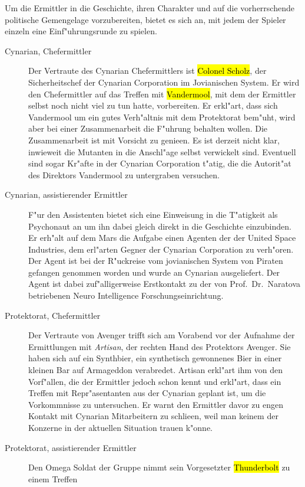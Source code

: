 
Um die Ermittler in die Geschichte, ihren Charakter und auf die vorherrschende politische Gemengelage vorzubereiten, bietet es sich an, mit jedem der Spieler einzeln eine Einf"uhrungsrunde zu spielen.

\begin{description}
	\item [Cynarian, Chefermittler] Der Vertraute des Cynarian Chefermittlers ist \hl{Colonel Scholz}, der Sicherheitschef der Cynarian 
		Corporation im Jovianischen System. Er wird den Chefermittler auf das Treffen mit \hl{Vandermool}, mit dem der Ermittler selbst noch nicht viel zu tun hatte, vorbereiten. Er erkl"art, dass sich Vandermool um ein gutes Verh"altnis mit dem Protektorat bem"uht, wird aber bei einer Zusammenarbeit die F"uhrung behalten wollen. Die Zusammenarbeit ist mit Vorsicht zu genie\3en. Es ist derzeit nicht klar, inwieweit die Mutanten in die Anschl"age selbst verwickelt sind. Eventuell sind sogar Kr"afte in der Cynarian Corporation t"atig, die die Autorit"at des Direktors Vandermool zu untergraben versuchen.
	\item [Cynarian, assistierender Ermittler] F"ur den Assistenten bietet sich eine Einweisung in die T"atigkeit als Psychonaut an um 
		ihn dabei gleich direkt in die Geschichte einzubinden. Er erh"alt auf dem Mars die Aufgabe einen Agenten der der United Space Industries, dem erl"arten Gegner der Cynarian Corporation zu verh"oren. Der Agent ist bei der R"uckreise vom jovianischen System von Piraten gefangen genommen worden und wurde an Cynarian ausgeliefert. Der Agent ist dabei zuf"alligerweise Erstkontakt zu der von Prof.~Dr.~Naratova betriebenen Neuro Intelligence Forschungseinrichtung.
	\item [Protektorat, Chefermittler] Der Vertraute von Avenger trifft sich am Vorabend vor der Aufnahme der Ermittlungen mit 
		\emph{Artisan}, der rechten Hand des Protektors Avenger. Sie haben sich auf ein Synthbier, ein synthetisch gewonnenes Bier in einer kleinen Bar auf Armageddon verabredet. Artisan erkl"art ihm von den Vorf"allen, die der Ermittler jedoch schon kennt und erkl"art, dass ein Treffen mit Repr"asentanten aus der Cynarian geplant ist, um die Vorkommnisse zu untersuchen. Er warnt den Ermittler davor zu engen Kontakt mit Cynarian Mitarbeitern zu schlie\3en, weil man keinem der Konzerne in der aktuellen Situation trauen k"onne.
	\item [Protektorat, assistierender Ermittler] Den Omega Soldat der Gruppe nimmt sein Vorgesetzter \hl{Thunderbolt} zu einem Treffen 

\end{description}
